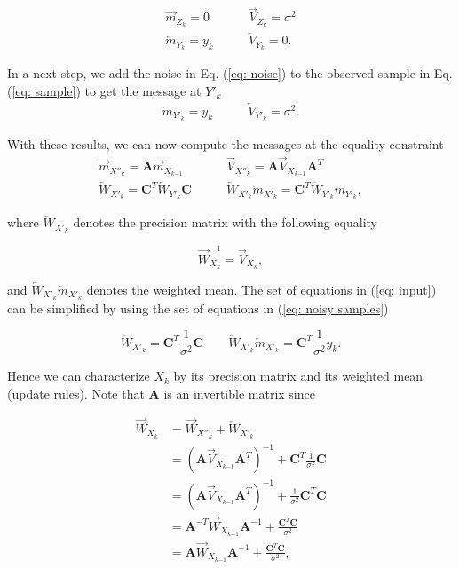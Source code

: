 \documentclass[11pt,a4paper,twoside]{report}
\newcommand{\messF}[3]{\overrightarrow{#1}_{{#2}_{k{#3}}}}
\newcommand{\messB}[3]{\overleftarrow{#1}_{{#2}_{k{#3}}}}
\newcommand{\mat}[1]{\mathbf{#1}}
\begin{document}
\begin{align}
	\label{eq: noise}
	\messF{m}{Z}{} = 0  \qquad &\messF{V}{Z}{} = \sigma^2 \\
	\label{eq: sample}
	\messB{m}{Y}{} = y_k  \qquad &\messB{V}{Y}{} = 0.
\end{align}

In a next step, we add the noise in Eq. (\ref{eq: noise}) to the observed sample in Eq. (\ref{eq: sample}) to get the message at $Y'_k$
\begin{align}
	\label{eq: noisy samples}
	\messB{m}{Y'}{} = y_k \qquad &\messB{V}{Y'}{} =  \sigma^2.
\end{align}

With these results, we can now compute the messages at the equality constraint
\begin{align}
	\label{eq: previous state}
	\messF{m}{X''}{} = \mat{A}\messF{m}{X}{-1} \qquad &\messF{V}{X''}{} = \mat{A}\messF{V}{X}{-1}\mat{A}^T \\
	\label{eq: input}
	\messB{W}{X'}{} = \mat{C}^T\messB{W}{Y'}{}\mat{C}  \qquad &\messB{W}{X'}{}\messB{m}{X'}{} = \mat{C}^T\messB{W}{Y'}{}\messB{m}{Y'}{},
\end{align}

where $\messB{W}{X'}{}$ denotes the precision matrix with the following equality

\begin{equation*}
	\messF{W}{X}{}^{-1} = \messF{V}{X}{},
\end{equation*}

and $\messB{W}{X'}{}\messB{m}{X'}{}$ denotes the weighted mean. The set of equations in (\ref{eq: input}) can be simplified by using the set of equations in (\ref{eq: noisy samples})

\begin{equation*}
	\messB{W}{X'}{} = \mat{C}^T\frac{1}{\sigma^2}\mat{C}  \qquad \messB{W}{X'}{}\messB{m}{X'}{} = \mat{C}^T\frac{1}{\sigma^2}y_k.
\end{equation*}


Hence we can characterize $X_k$ by its precision matrix and its weighted mean (update rules). Note that $\mat{A}$ is an invertible matrix since 

\begin{align}
  \label{eq: precision matrix}
  \messF{W}{X}{} &= \messF{W}{X''}{} + \messB{W}{X'}{} \\
  &= \left(\mat{A}\messF{V}{X}{-1}\mat{A}^T\right)^{-1} + \mat{C}^T\frac{1}{\sigma^2}\mat{C} \\
  & = \left(\mat{A}\messF{V}{X}{-1}\mat{A}^T\right)^{-1} + \frac{1}{\sigma^2}\mat{C}^T\mat{C} \\
  & = \mat{A}^{-T}\messF{W}{X}{-1}\mat{A}^{-1} + \frac{\mat{C}^T\mat{C}}{\sigma^2}  \\
  & = \mat{A}\messF{W}{X}{-1}\mat{A}^{-1} + \frac{\mat{C}^T\mat{C}}{\sigma^2},
\end{align}
\end{document}
